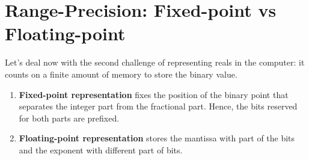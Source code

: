 %        
  
  
  
  
    
    \section{Range-Precision: Fixed-point vs Floating-point}

Let's deal now with the second challenge of representing reals in the computer: 
it counts on a finite amount of memory to store the binary value.

\begin{enumerate}
    \item \textbf{Fixed-point representation} fixes the position of the binary point that separates 
    the integer part from the fractional part. Hence, the bits reserved for both parts are prefixed. 
    
    \item \textbf{Floating-point representation} stores the mantissa with part of the bits and 
    the exponent with different part of bits.
\end{enumerate}

